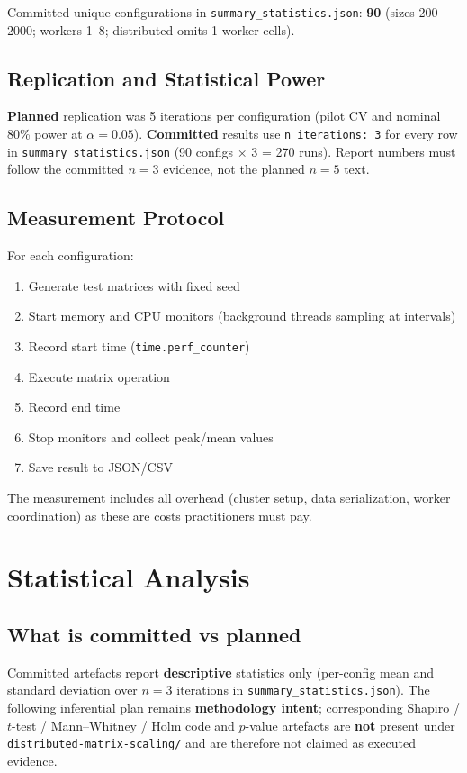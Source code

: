 Committed unique configurations in \texttt{summary\_statistics.json}: \textbf{90} (sizes 200--2000; workers 1--8; distributed omits 1-worker cells).

\subsection{Replication and Statistical Power}

\textbf{Planned} replication was 5 iterations per configuration (pilot CV and nominal 80\% power at $\alpha=0.05$). \textbf{Committed} results use \texttt{n\_iterations: 3} for every row in \texttt{summary\_statistics.json} (90 configs × 3 = 270 runs). Report numbers must follow the committed $n{=}3$ evidence, not the planned $n{=}5$ text.

\subsection{Measurement Protocol}

For each configuration:

\begin{enumerate}
    \item Generate test matrices with fixed seed
    \item Start memory and CPU monitors (background threads sampling at intervals)
    \item Record start time (\texttt{time.perf\_counter})
    \item Execute matrix operation
    \item Record end time
    \item Stop monitors and collect peak/mean values
    \item Save result to JSON/CSV
\end{enumerate}

The measurement includes all overhead (cluster setup, data serialization, worker coordination) as these are costs practitioners must pay.

\section{Statistical Analysis}

\subsection{What is committed vs planned}

Committed artefacts report \textbf{descriptive} statistics only (per-config mean and standard deviation over $n{=}3$ iterations in \texttt{summary\_statistics.json}). The following inferential plan remains \textbf{methodology intent}; corresponding Shapiro / $t$-test / Mann--Whitney / Holm code and $p$-value artefacts are \textbf{not} present under \texttt{distributed-matrix-scaling/} and are therefore not claimed as executed evidence.

